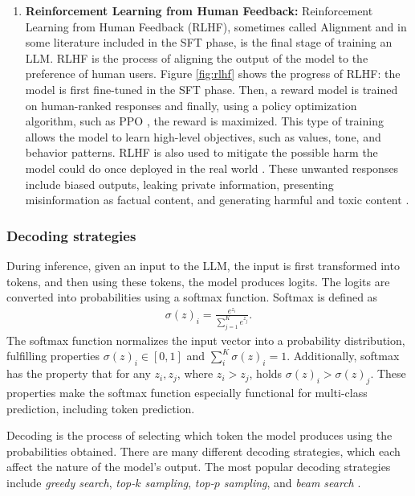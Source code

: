 \documentclass[english, 12pt, a4paper, sci, utf8, a-2b, online]{../definitions/aaltothesis}
\begin{document}
\begin{enumerate}
    \item \textbf{Reinforcement Learning from Human Feedback:} Reinforcement Learning from Human Feedback (RLHF), sometimes called Alignment and in some literature included in the SFT phase, is the final stage of training an LLM. RLHF is the process of aligning the output of the model to the preference of human users. Figure \ref{fig:rlhf} shows the progress of RLHF: the model is first fine-tuned in the SFT phase. Then, a reward model is trained on human-ranked responses and finally, using a policy optimization algorithm, such as PPO \cite{zhang2025instructiontuninglargelanguage}, the reward is maximized. This type of training allows the model to learn high-level objectives, such as values, tone, and behavior patterns. RLHF is also used to mitigate the possible harm the model could do once deployed in the real world \cite{ouyang2022traininglanguagemodelsfollow}. These unwanted responses include biased outputs, leaking private information, presenting misinformation as factual content, and generating harmful and toxic content \cite{weidinger2021ethicalsocialrisksharm}.
\end{enumerate}

\subsubsection{Decoding strategies} \label{sec:decoding}

During inference, given an input to the LLM, the input is first transformed into tokens, and then using these tokens, the model produces logits. The logits are converted into probabilities using a softmax function. Softmax is defined as
\begin{align}
    \sigma(z)_i = \frac{e^{z_i}}{\sum^{K}_{j=1}e^{z_j}}.
\end{align}
The softmax function normalizes the input vector into a probability distribution, fulfilling properties $\sigma(z)_i \in [0, 1]$ and $\sum_i^K \sigma(z)_i = 1$. Additionally, softmax has the property that for any $z_i, z_j$, where $z_i > z_j$, holds $\sigma(z)_i > \sigma(z)_j$. These properties make the softmax function especially functional for multi-class prediction, including token prediction.

Decoding is the process of selecting which token the model produces using the probabilities obtained. There are many different decoding strategies, which each affect the nature of the model's output. The most popular decoding strategies include \textit{greedy search}, \textit{top-$k$ sampling}, \textit{top-$p$ sampling}, and \textit{beam search} \cite{Minaee2024-fr}.
\end{document}
